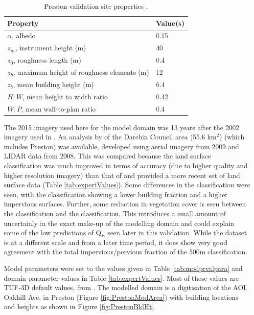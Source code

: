 \documentclass[final,3p,times,authoryear]{elsarticle}
\begin{document}
\begin{table}[!htbp]
\caption{Preston validation site properties \citep{Coutts2007}. \label{tab:prvalpara}}     
\begin{tabular}{| l | l |}
\hline
\textbf{Property} & \textbf{Value(s)} \\ \hline
$\alpha$, albedo & 0.15  \\ \hline
$z_{m}$, instrument height (m)&  40  \\ \hline
$z_{0}$, roughness length (m)& 0.4  \\ \hline
$z_{h}$, maximum height of roughness elements (m)& 12  \\ \hline
$z_{b}$, mean building height (m)& 6.4  \\ \hline
$H:W$, mean height to width ratio& 0.42  \\ \hline
$W:P$, mean wall-to-plan ratio &0.4  \\ \hline
\end{tabular}
\end{table}

The 2015 imagery used here for the model domain was 13 years after the 2002 imagery used in \cite{Coutts2007}. An analysis by \cite{Nury2015} of the Darebin Council area (55.6 km$^{2}$) (which includes Preston) was available, developed using aerial imagery from 2009 and LIDAR data from 2008. This was compared because the land surface classification was much improved in terms of accuracy (due to higher quality and higher resolution imagery) than that of \cite{Coutts2007} and provided a more recent set of land surface data (Table \ref{tab:expertValues}). Some differences in the classification were seen, with the \cite{Nury2015} classification showing a lower building fraction and a higher impervious surfaces. Further, some reduction in vegetation cover is seen between the \cite{Coutts2007} classification and the \cite{Nury2015} classification. This introduces a small amount of uncertainly in the exact make-up of the modelling domain and could explain some of the low predictions of Q$_{E}$ seen later in this validation. While the \cite{Nury2015} dataset is at a different scale and from a later time period, it does show very good agreement with the total impervious/pervious fraction of the 500m classification.


Model parameters were set to the values given in Table \ref{tab:modprvalpara} and domain parameter values in Table \ref{tab:expertValues}. Most of these values are TUF-3D default values, from \cite{Krayenhoff2007}. The modelled domain is a digitisation of the AOI, Oakhill Ave. in Preston (Figure \ref{fig:PrestonModArea}) with building locations and heights as shown in Figure \ref{fig:PrestonBldHt}.
\end{document}
